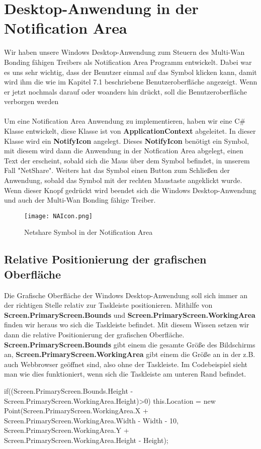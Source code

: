 \section{Desktop-Anwendung in der Notification Area}
Wir haben unsere Windows Desktop-Anwendung zum Steuern des Multi-Wan Bonding fähigen Treibers als Notification Area Programm entwickelt. Dabei war es uns sehr wichtig, dass der Benutzer einmal auf das Symbol klicken kann, damit wird ihm die wie im Kapitel 7.1 beschriebene Benutzeroberfläche angezeigt. Wenn er jetzt nochmals darauf oder woanders hin drückt, soll die Benutzeroberfläche verborgen werden
\\\\
Um eine Notification Area Anwendung zu implementieren, haben wir eine C\# Klasse entwickelt, diese Klasse ist von \textbf{ApplicationContext} abgeleitet. In dieser Klasse wird ein \textbf{NotifyIcon} angelegt. Dieses \textbf{NotifyIcon} benötigt ein Symbol, mit diesem wird dann die Anwendung in der Notfication Area abgelegt, einen Text der erscheint, sobald sich die Maus über dem Symbol befindet, in unserem Fall "NetShare". Weiters hat das Symbol einen Button zum Schließen der Anwendung, sobald das Symbol mit der rechten Maustaste angeklickt wurde. Wenn dieser Knopf gedrückt wird beendet sich die Windows Desktop-Anwendung und auch der Multi-Wan Bonding fähige Treiber.
\begin{figure}[H]
    \centering
    \texttt{[image: NAIcon.png]}
    \caption[Netshare Symbol in der Notification Area]{Netshare Symbol in der Notification Area} 
\end{figure}
\noindent

\newpage
\subsection{Relative Positionierung der grafischen Oberfläche}
Die Grafische Oberfläche der Windows Desktop-Anwendung soll sich immer an der richtigen Stelle relativ zur Taskleiste positionieren. Mithilfe von \textbf{Screen.PrimaryScreen.Bounds} und \textbf{Screen.PrimaryScreen.WorkingArea} finden wir heraus wo sich die Taskleiste befindet. Mit diesem Wissen setzen wir dann die relative Positionierung der grafischen Oberfläche. \textbf{Screen.PrimaryScreen.Bounds} gibt einem die gesamte Größe des Bildschirms an, \textbf{Screen.PrimaryScreen.WorkingArea} gibt einem die Größe an in der z.B. auch Webbrowser geöffnet sind, also ohne der  Taskleiste. Im Codebeispiel sieht man wie dies funktioniert, wenn sich die Taskleiste am unteren Rand befindet.
\begin{program}[H]
\caption{Taskleiste unten}
\begin{CSharpCode}
if((Screen.PrimaryScreen.Bounds.Height - Screen.PrimaryScreen.WorkingArea.Height)>0)
{
    this.Location = new Point(Screen.PrimaryScreen.WorkingArea.X + 
      Screen.PrimaryScreen.WorkingArea.Width - Width - 10, 
      Screen.PrimaryScreen.WorkingArea.Y + Screen.PrimaryScreen.WorkingArea.Height 
      - Height);
}
\end{CSharpCode}
\end{program}
\noindent

